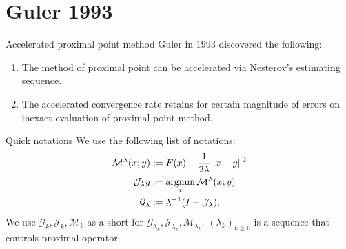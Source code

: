 \documentclass[11pt]{beamer}
\begin{document}
\section{Guler 1993}
    \begin{frame}{Accelerated proximal point method}
        Guler in 1993 discovered the following: 
        \begin{enumerate}
            \item The method of proximal point can be accelerated via Nesterov's estimating sequence. 
            \item The accelerated convergence rate retains for certain magnitude of errors on inexact evaluation of proximal point method. 
        \end{enumerate}
        \begin{block}{Quick notations}
            We use the following list of notations: 
            \begin{align*}
                \mathcal M^{\lambda} (x; y) &:= F(x) + \frac{1}{2\lambda}\Vert x - y\Vert^2
                \\
                \mathcal J_\lambda y &:= \mathop{\rm argmin}\limits_x \mathcal M^{\lambda} (x; y)
                \\
                \mathcal G_\lambda &:= \lambda^{-1}(I - \mathcal J_\lambda). 
            \end{align*}
            We use $\mathcal G_k, \mathcal J_k, \mathcal M_k$ as a short for $\mathcal G_{\lambda_k}, \mathcal J_{\lambda_k}, \mathcal M_{\lambda_k}$. 
            $(\lambda_k)_{k \ge0}$ is a sequence that controls proximal operator. 
        \end{block}
    \end{frame}
\end{document}
